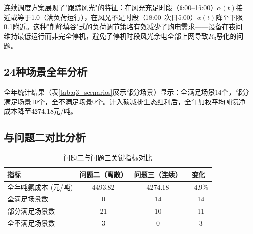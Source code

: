 连续调度方案展现了"跟踪风光"的特征：在风光充足时段（6:00--16:00）$\alpha(t)$接近或等于1.0（满负荷运行），在风光不足时段（18:00--次日5:00）$\alpha(t)$降至下限0.1附近。这种"削峰填谷"式的负荷调节策略有效减少了购电需求——设备在夜间维持最低运行而非完全停机，避免了停机时段风光余电全部上网导致$R_3$恶化的问题。

\subsection{24种场景全年分析}

\begin{table}[H]
\centering
\caption{问题三24场景连续调节最优方案汇总（部分场景）}\label{tab:q3_scenarios}
\end{table}

全年统计结果（表\ref{tab:q3_scenarios}展示部分场景）显示：全满足场景14个，部分满足场景10个，全不满足场景0个。计入碳减排生态红利后，全年加权平均吨氨净成本降至4274.18元/吨。

\subsection{与问题二对比分析}

\begin{table}[H]
\centering
\caption{问题二与问题三关键指标对比}\label{tab:q3_compare}
\begin{tabular}{lccc}
\toprule
指标 & 问题二（离散） & 问题三（连续） & 变化 \\
\midrule
全年吨氨成本 (元/吨) & 4493.82 & 4274.18 & $-$4.9\% \\
全满足场景数 & 0 & 14 & +14 \\
部分满足场景数 & 21 & 10 & $-$11 \\
全不满足场景数 & 3 & 0 & $-$3 \\
\bottomrule
\end{tabular}
\end{table}

